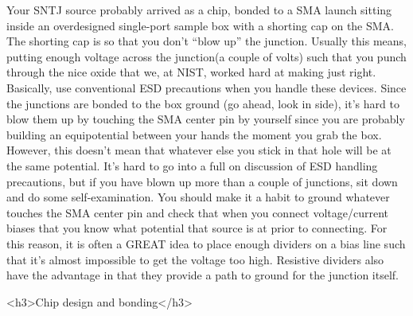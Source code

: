 \documentclass[11pt]{article}
\begin{document}
    Your SNTJ source probably arrived as a chip, bonded to a SMA launch sitting inside an overdesigned single-port sample box with a shorting cap on the SMA. The shorting cap is so that you don’t “blow up” the junction. Usually this means, putting enough voltage across the junction(a couple of volts) such that you punch through the nice oxide that we, at NIST, worked hard at making just right. Basically, use conventional ESD precautions when you handle these devices. Since the junctions are bonded to the box ground (go ahead, look in side), it’s hard to blow them up by touching the SMA center pin by yourself since you are probably building an equipotential between your hands the moment you grab the box. However, this doesn’t mean that whatever else you stick in that hole will be at the same potential. It’s hard to go into a full on discussion of ESD handling precautions, but if you have blown up more than a couple of junctions, sit down and do some self-examination. You should make it a habit to ground whatever touches the SMA center pin and check that when you connect voltage/current biases that  you know what potential that source is at prior to connecting. For this reason, it is often a GREAT idea to place enough dividers on a bias line such that it’s almost impossible to get the voltage too high. Resistive dividers also have the advantage in that they provide a path to ground for the junction itself.
    
<h3>Chip design and bonding</h3>
\end{document}
